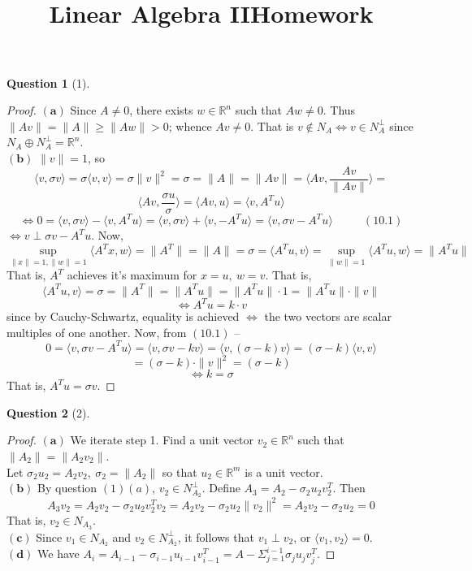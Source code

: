 \documentclass[11pt]{article}
\title{\vspace{-50pt}
\Huge \name
\\\vspace{20pt}
\huge Linear Algebra II\hfill Homework \hw}
\author{}
\date{}
\theoremstyle{quest}
\newtheorem*{question}{Question}
\begin{document}
\maketitle

\begin{question}[1]
\end{question}
\begin{proof}
$\mathbf{(a)}$ Since $A \ne 0$, there exists $w \in \mathbb{R}^{n}$ such that $Aw \ne 0$. Thus
\\$\|Av\| = \|A\| \ge \|Aw\| > 0$; whence $Av \ne 0$. That is $v \not\in N_A \iff v \in N_A^{\perp}$ since $N_A \oplus N_A^{\perp} = \mathbb{R}^n$.
\\$\mathbf{(b)}$ $\|v\| = 1$, so
$$\langle v, \sigma v \rangle = \sigma \langle v, v \rangle = \sigma \|v\|^2 = \sigma = \|A\| = \|Av\| = \langle Av, \frac{Av}{\|Av\|} \rangle = $$ $$\langle Av, \frac{\sigma u}{\sigma} \rangle = \langle Av, u \rangle = \langle v, A^T u \rangle$$
$$\iff 0= \langle v, \sigma v \rangle - \langle v, A^T u \rangle = \langle v, \sigma v \rangle + \langle v, -A^T u \rangle = \langle v, 
\sigma v - A^T u \rangle\ \ \ \ \ \ \ \ \ \ \ \ (10.1)$$
$\iff v \perp \sigma v - A^T u$.
Now,
$$\sup_{\|x\|=1, \|w\| = 1}\langle A^Tx, w \rangle = \|A^T\| = \|A\| = \sigma = \langle A^Tu, v  \rangle = \sup_{\|w\|=1} \langle A^Tu, w \rangle = \|A^Tu\|$$
That is, $A^T$ achieves it's maximum for $x = u,\ w=v$. That is,
$$\langle A^Tu, v  \rangle = \sigma = \|A^T\| = \|A^Tu\| = \|A^Tu\| \cdot 1 = \|A^Tu\| \cdot \|v\|$$
$$\iff A^Tu = k \cdot v$$
since by Cauchy-Schwartz, equality is achieved $\iff$ the two vectors are scalar multiples of one another.
Now, from $(10.1)$ --
$$0 = \langle v, \sigma v - A^Tu \rangle = \langle v, \sigma v - kv \rangle = \langle v, (\sigma - k)v \rangle = (\sigma - k)\langle v, v \rangle$$
$$=(\sigma - k) \cdot \|v\|^2 = (\sigma - k)$$
$$\iff k = \sigma$$
That is, $A^Tu = \sigma v$.
\end{proof}

\begin{question}[2]
\end{question}
\begin{proof}
$\mathbf{(a)}$ We iterate step 1. Find a unit vector $v_2 \in \mathbb{R}^n$ such that $\|A_2\| = \|A_2v_2\|$.
\\Let $\sigma_2 u_2 = A_2 v_2,\ \sigma_2 = \|A_2\|$ so that $u_2 \in \mathbb{R}^m$ is a unit vector.
\\$\mathbf{(b)}$ By question $(1)(a)$, $v_2 \in N_{A_2}^{\perp}$. Define $A_3 = A_2 - \sigma_2 u_2 v_2^T$. Then
$$A_3 v_2 = A_2 v_2 - \sigma_2 u_2 v_2^Tv_2 = A_2 v_2 - \sigma_2 u_2 \|v_2\|^2 = A_2 v_2 - \sigma_2 u_2 = 0$$
That is, $v_2 \in N_{A_3}$.
\\$\mathbf{(c)}$ Since $v_1 \in N_{A_2}$ and $v_2 \in N_{A_2}^{\perp}$, it follows that $v_1 \perp v_2$, or $\langle v_1, v_2 \rangle = 0$.
\\$\mathbf{(d)}$ We have $A_i = A_{i-1} - \sigma_{i-1} u_{i-1} v_{i-1}^T = A - \Sigma_{j=1}^{i-1} \sigma_j u_j v_j^T$.
\end{proof}
\end{document}
